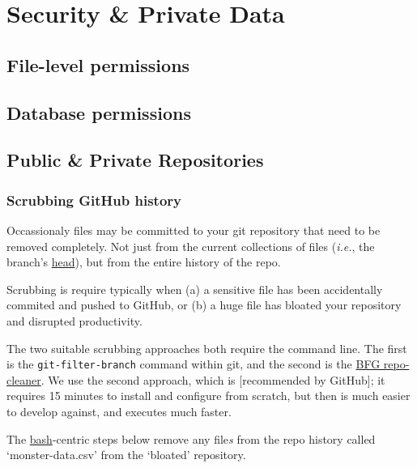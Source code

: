 \documentclass[
]{book}
\begin{document}
\hypertarget{security}{%
\chapter{Security \& Private Data}\label{security}}

\hypertarget{file-level-permissions}{%
\section{File-level permissions}\label{file-level-permissions}}

\hypertarget{database-permissions}{%
\section{Database permissions}\label{database-permissions}}

\hypertarget{public-private-repositories}{%
\section{Public \& Private Repositories}\label{public-private-repositories}}

\hypertarget{scrubbing-github-history}{%
\subsection{Scrubbing GitHub history}\label{scrubbing-github-history}}

Occassionaly files may be committed to your git repository that need to be removed completely. Not just from the current collections of files (\emph{i.e.}, the branch's \href{https://git-scm.com/docs/gitglossary\#gitglossary-aiddefHEADaHEAD}{head}), but from the entire history of the repo.

Scrubbing is require typically when (a) a sensitive file has been accidentally commited and pushed to GitHub, or (b) a huge file has bloated your repository and disrupted productivity.

The two suitable scrubbing approaches both require the command line. The first is the \texttt{git-filter-branch} command within git, and the second is the \href{https://rtyley.github.io/bfg-repo-cleaner/}{BFG repo-cleaner}. We use the second approach, which is {[}recommended by GitHub{]}; it requires 15 minutes to install and configure from scratch, but then is much easier to develop against, and executes much faster.

The \href{https://www.gnu.org/software/bash/}{bash}-centric steps below remove any file\emph{s} from the repo history called `monster-data.csv' from the `bloated' repository.
\end{document}

